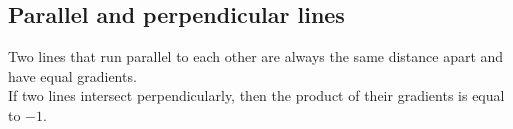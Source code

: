 \subsection*{Parallel and perpendicular lines}    
% 
Two lines that run parallel to each other are always the same distance apart and have equal gradients. \\
If two lines intersect perpendicularly, then the product of their gradients is equal to $-1$. \\

